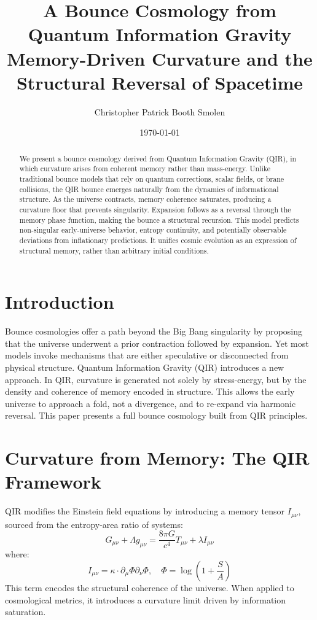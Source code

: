 \documentclass[11pt]{article}
\title{A Bounce Cosmology from Quantum Information Gravity\\
\large Memory-Driven Curvature and the Structural Reversal of Spacetime}
\author{Christopher Patrick Booth Smolen}
\date{\today}
\begin{document}
\maketitle

\begin{abstract}
We present a bounce cosmology derived from Quantum Information Gravity (QIR), in which curvature arises from coherent memory rather than mass-energy. Unlike traditional bounce models that rely on quantum corrections, scalar fields, or brane collisions, the QIR bounce emerges naturally from the dynamics of informational structure. As the universe contracts, memory coherence saturates, producing a curvature floor that prevents singularity. Expansion follows as a reversal through the memory phase function, making the bounce a structural recursion. This model predicts non-singular early-universe behavior, entropy continuity, and potentially observable deviations from inflationary predictions. It unifies cosmic evolution as an expression of structural memory, rather than arbitrary initial conditions.
\end{abstract}

\section{Introduction}
Bounce cosmologies offer a path beyond the Big Bang singularity by proposing that the universe underwent a prior contraction followed by expansion. Yet most models invoke mechanisms that are either speculative or disconnected from physical structure. Quantum Information Gravity (QIR) introduces a new approach. In QIR, curvature is generated not solely by stress-energy, but by the density and coherence of memory encoded in structure. This allows the early universe to approach a fold, not a divergence, and to re-expand via harmonic reversal. This paper presents a full bounce cosmology built from QIR principles.

\section{Curvature from Memory: The QIR Framework}
QIR modifies the Einstein field equations by introducing a memory tensor \( I_{\mu\nu} \), sourced from the entropy-area ratio of systems:
\[
G_{\mu\nu} + \Lambda g_{\mu\nu} = \frac{8\pi G}{c^4} T_{\mu\nu} + \lambda I_{\mu\nu}
\]
where:
\[
I_{\mu\nu} = \kappa \cdot \partial_\mu \Phi \partial_\nu \Phi,\quad \Phi = \log\left(1 + \frac{S}{A}\right)
\]
This term encodes the structural coherence of the universe. When applied to cosmological metrics, it introduces a curvature limit driven by information saturation.
\end{document}
